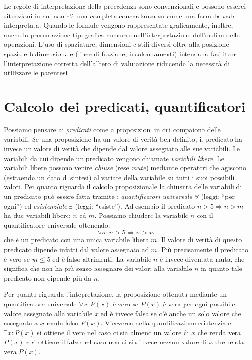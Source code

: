 \documentclass[italian,a4paper,hidelinks,headinclude]{scrartcl}
\newcommand{\myemph}[1]{\emph{#1}\marginpar{#1}}
\begin{document}
Le regole di interpretazione della precedenza sono convenzionali
e possono esserci situazioni in cui non c'è una completa concordanza su come
una formula vada interpretata.
Quando le formule vengono rappresentate graficamente, inoltre,
anche la presentazione tipografica concorre nell'interpretazione
dell'ordine delle operazioni.
L'uso di spaziature, dimensioni e stili diversi oltre alla
posizione spaziale bidimensionale (linee di frazione, incolonnamenti)
intendono facilitare
l'interpretazione corretta dell'albero di valutazione riducendo
la necessità di utilizzare le parentesi.
\begin{comment}
Esempi di formule di dubbia interpretazione in
cui l'uso delle parentesi sarebbe invece auspicabile:
\[
  x/2\,y,\qquad
  \sin x \cdot 2, \qquad
  {e^x}^2, \qquad
  \frac{\displaystyle\frac{x}{y}}{z}.
\]
\end{comment}

\section{Calcolo dei predicati, quantificatori}

Possiamo pensare ai \myemph{predicati} come a proposizioni in cui
compaiono delle variabili.
Se una proposizione ha un valore di verità ben definito, il predicato
ha invece un valore di verità che dipende dal valore assegnato alle sue
variabili. Le variabili da cui dipende un predicato vengono chiamate
\myemph{variabili libere}. Le variabili libere possono venire \emph{chiuse}
(rese \emph{mute}) mediante operatori che agiscono
(estraendo un dato di sintesi) al variare della variabile su tutti i
suoi possibili valori.
Per quanto riguarda il calcolo proposizionale la chiusura delle variabili
di un predicato può essere fatta tramite i \myemph{quantificatori}
\emph{universale} $\forall$ (leggi: ``per ogni'') ed
\emph{esistenziale} $\exists$ (leggi: ``esiste'').
Ad esempio il predicato
$n>5 \Rightarrow n>m$ ha due variabili libere: $n$ ed $m$.
Possiamo chiudere la variabile $n$ con il quantificatore universale ottenendo:
\[
  \forall n \colon n>5 \Rightarrow n>m
\]
che è un predicato con una unica variabile libera $m$. Il valore di verità di questo
predicato dipende infatti dal valore assegnato ad $m$.
Più precisamente il predicato è vero se $m\le 5$ ed è falso altrimenti.
La variabile $n$ è invece diventata muta, che significa che non ha più senso
assegnare dei valori alla variabile $n$ in quanto tale predicato non dipende
più da $n$.

Per quanto riguarda l'intepretazione,
la proposizione ottenuta mediante un quantificatore universale
$\forall x\colon P(x)$ è vera se $P(x)$ è vera per ogni possibile valore
assegnato alla variabile $x$ ed è invece falsa se c'è anche un solo valore che
assegnato a $x$ rende falsa $P(x)$. Viceversa nella quantificazione
esistenziale $\exists x\colon P(x)$ si ottiene il vero nel caso ci sia almeno
un valore di $x$ che renda vera $P(x)$ e si ottiene il falso nel caso non ci sia
invece nessun valore di $x$ che renda vera $P(x)$.
\end{document}

